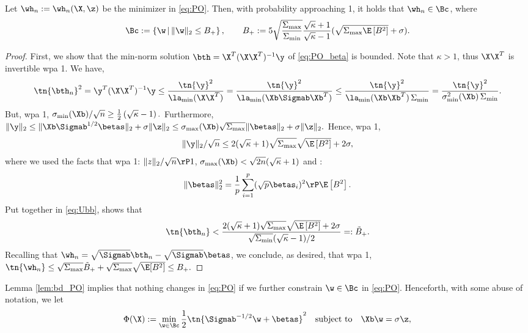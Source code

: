 \begin{lemma}\label{lem:bd_PO}
Let $\wh_n:=\wh_n(\X,\z)$ be the minimizer in \eqref{eq:PO}. Then, with probability approaching 1, it holds that $\wh_n\in\Bc$, where
$$\Bc:=\left\{\w\,|\,\|\w\|_2\leq B_{+} \right\},\qquad B_+:=5\sqrt{\frac{\Sigma_{\max}}{\Sigma_{\min}}}\frac{\sqrt{\kappa}+1}{\sqrt{\kappa}-1}(\sqrt{\Sigma_{\max}\E\left[B^2\right]} + \sigma).
$$ 
\end{lemma}
\begin{proof}
First, we show that the min-norm solution $\bth=\X^T(\X\X^T)^{-1}\y$ of \eqref{eq:PO_beta} is bounded. Note that $\kappa>1$, thus $\X\X^T$ is invertible wpa 1. We
have,
\begin{align}
\tn{\bth_n}^2 = \y^T(\X\X^T)^{-1}\y \leq \frac{\tn{\y}^2}{\la_{\min}(\X\X^T)}  = \frac{\tn{\y}^2}{\la_{\min}(\Xb\Sigmab\Xb^T)} \leq  \frac{\tn{\y}^2}{\la_{\min}(\Xb\Xb^T)\,\Sigma_{\min}} = \frac{\tn{\y}^2}{\sigma_{\min}^2(\Xb)\,\Sigma_{\min}}. \label{eq:Ubb}
\end{align}
But, wpa 1, 
$
\sigma_{\min}(\Xb)/\sqrt{n} \geq \frac{1}{2}\left(\sqrt{\kappa}-1\right).
$
Furthermore, 
$
\|\y\|_2 \leq \|\Xb\Sigmab^{1/2}\betas\|_2 + \sigma\|\z\|_2 \leq \sigma_{\max}(\Xb)\sqrt{\Sigma_{\max}} \|\betas\|_2 + \sigma\|\z\|_2.
$
Hence, wpa 1,
$$
\|\y\|_2/\sqrt{n} \leq 2(\sqrt{\kappa}+1)\sqrt{\Sigma_{\max}} \sqrt{\E\left[B^2\right]} + 2\sigma,
$$
where we used the facts that wpa 1: $\|z\|_2/\sqrt{n}\rP 1$, $\sigma_{\max}(\Xb)<\sqrt{2n}(\sqrt{\kappa}+1)$ and :
$$
\|\betas\|_2^2 = \frac{1}{p}\sum_{i=1}^{p}(\sqrt{p}\betas_i)^2 \rP \E\left[B^2\right].
$$
Put together in \eqref{eq:Ubb}, shows that
\begin{align}
\tn{\bth_n} < \frac{2(\sqrt{\kappa}+1)\sqrt{\Sigma_{\max}} \sqrt{\E\left[B^2\right]} + 2\sigma}{\sqrt{\Sigma_{\min}}(\sqrt{\kappa}-1)/2} =: \tilde{B}_+.\label{eq:bd_beta}
\end{align}
Recalling that $\wh_n= \sqrt{\Sigmab}\bth_n - \sqrt{\Sigmab}\betas$, we conclude, as desired, that wpa 1,
$
\tn{\wh_n} \leq \sqrt{\Sigma_{\max}}\tilde{B}_+ + \sqrt{\Sigma_{\max}} \sqrt{\E[B^2]} \leq B_+.
$
\end{proof}

%


Lemma \ref{lem:bd_PO} implies that nothing changes in \eqref{eq:PO} if we further constrain $\w\in\Bc$ in \eqref{eq:PO}. Henceforth, with some abuse of notation, we let
\begin{align}\label{eq:PO_bd}
\Phi(\X):=\min_{\w\in\Bc} \frac{1}{2}\tn{\Sigmab^{-1/2}\w+\betas}^2\quad\text{subject to}\quad \Xb\w=\sigma \z,
\end{align}

